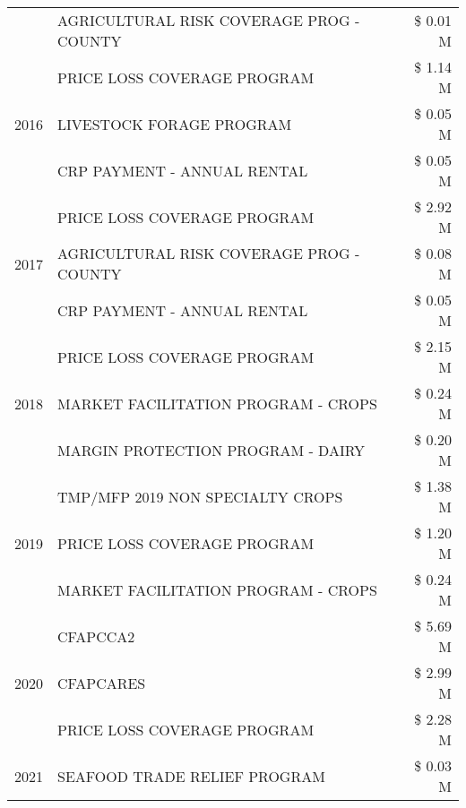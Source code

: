 \begin{tabular}{llr}
 & AGRICULTURAL RISK COVERAGE PROG - COUNTY & \$ 0.01 M \\
\cline{1-3}
\multirow[t]{3}{*}{2016} & PRICE LOSS COVERAGE PROGRAM & \$ 1.14 M \\
 & LIVESTOCK FORAGE PROGRAM & \$ 0.05 M \\
 & CRP PAYMENT - ANNUAL RENTAL & \$ 0.05 M \\
\cline{1-3}
\multirow[t]{3}{*}{2017} & PRICE LOSS COVERAGE PROGRAM & \$ 2.92 M \\
 & AGRICULTURAL RISK COVERAGE PROG - COUNTY & \$ 0.08 M \\
 & CRP PAYMENT - ANNUAL RENTAL & \$ 0.05 M \\
\cline{1-3}
\multirow[t]{3}{*}{2018} & PRICE LOSS COVERAGE PROGRAM & \$ 2.15 M \\
 & MARKET FACILITATION PROGRAM - CROPS & \$ 0.24 M \\
 & MARGIN PROTECTION PROGRAM - DAIRY & \$ 0.20 M \\
\cline{1-3}
\multirow[t]{3}{*}{2019} & TMP/MFP 2019 NON SPECIALTY CROPS & \$ 1.38 M \\
 & PRICE LOSS COVERAGE PROGRAM & \$ 1.20 M \\
 & MARKET FACILITATION PROGRAM - CROPS & \$ 0.24 M \\
\cline{1-3}
\multirow[t]{3}{*}{2020} & CFAPCCA2 & \$ 5.69 M \\
 & CFAPCARES & \$ 2.99 M \\
 & PRICE LOSS COVERAGE PROGRAM & \$ 2.28 M \\
\cline{1-3}
2021 & SEAFOOD TRADE RELIEF PROGRAM & \$ 0.03 M \\
\cline{1-3}
\bottomrule
\end{tabular}
